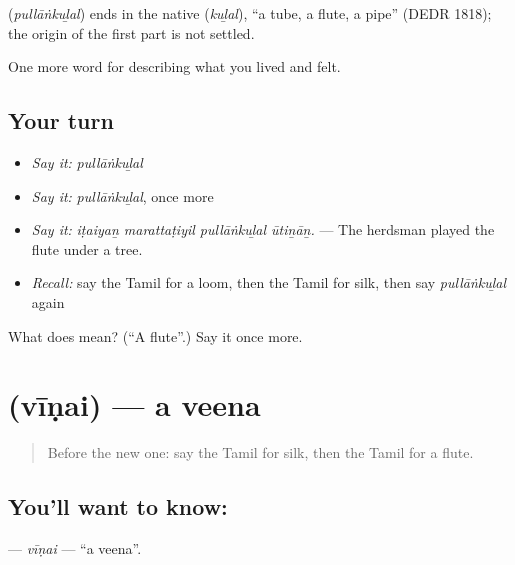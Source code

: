 \begin{cousinweb}
\textbf{} (\emph{pullāṅkuḻal}) ends in the native  (\emph{kuḻal}), \textquotedblleft{}a tube, a flute, a pipe\textquotedblright{} (DEDR 1818); the origin of the first part is not settled.
\end{cousinweb}

\begin{grammarlens}[title={What you've built}]
One more word for describing what you lived and felt.
\end{grammarlens}

\subsection*{Your turn}
\begin{itemize}
\raggedright
  \item \emph{Say it:} \emph{pullāṅkuḻal}
  \item \emph{Say it:} \emph{pullāṅkuḻal}, once more
  \item \emph{Say it:} \emph{iṭaiyaṉ marattaṭiyil pullāṅkuḻal ūtiṉāṉ.} — The herdsman played the flute under a tree.
  \item \emph{Recall:} say the Tamil for a loom, then the Tamil for silk, then say \emph{pullāṅkuḻal} again
\end{itemize}

\begin{tcolorbox}[breakable,colback=teal!4,colframe=teal!35!black,title={Before you move on}]
What does  mean? (\textquotedblleft{}A flute\textquotedblright{}.) Say it once more.
\end{tcolorbox}
\section[\texorpdfstring{\ta{வீணை} (vīṇai)}{வீணை (vīṇai)}]{ (vīṇai) — a veena}

\label{lesson:TA-C539-vinai}



\begin{quote}
Before the new one: say the Tamil for silk, then the Tamil for a flute.
\end{quote}

\subsection*{You'll want to know: }
\textbf{} — \emph{vīṇai} — \textquotedblleft{}a veena\textquotedblright{}.

